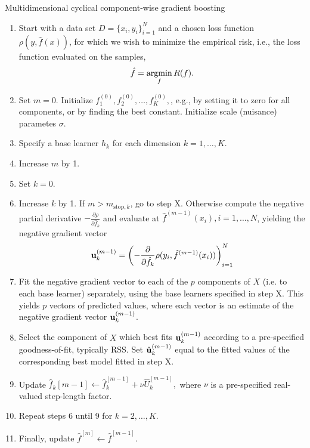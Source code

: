 \begin{algorithm}
\caption{Multidimensional cyclical component-wise gradient boosting}
\label{algo:multi-cyclical}
\begin{enumerate}
    \item Start with a data set $D=\{x_i, y_i\}_{i=1}^N$ and a chosen loss function $\rho(y,\hat{f}(x))$, for which we wish to
        minimize the empirical risk, i.e., the loss function evaluated on the samples,
        \begin{equation}
            \hat{f}=\operatorname*{argmin}_{f}R(f).
        \end{equation}
    \item Set $m=0$. Initialize $f^{(0)}_1,f^{(0)}_2,\ldots,f^{(0)}_K,$, e.g., by setting it to zero for all components, or by finding the best constant. Initialize scale (nuisance) parametes $\sigma$.
    \item Specify a base learner $h_k$ for each dimension $k=1,\ldots,K$.
    \item Increase $m$ by 1.
    \item Set $k=0$.
    \item Increase $k$ by 1. If $m>m_{\text{stop},k}$, go to step X. Otherwise compute the negative partial derivative
        $-\frac{\partial\rho}{\partial \hat{f}_k}$ and evaluate at $\hat{f}^{(m-1)}(x_i),i=1,\ldots,N$, yielding the
        negative gradient vector
        \begin{equation}
            \mathbf{u}^{(m-1)}_k=\left(-\frac{\partial}{\partial \hat{f}_k}\rho(y_i, \hat{f}^{(m-1)}(x_i))\right)_{i=1}^N
        \end{equation}
    \item Fit the negative gradient vector to each of the $p$ components of $X$ (i.e. to each base learner) separately, using the base learners specified in step X. This yields $p$ vectors of predicted values, where each vector is an estimate of the negative gradient vector $\mathbf{u}^{(m-1)}_k$.
    \item Select the component of $X$ which best fits $\mathbf{u}^{(m-1)}_k$ according to a pre-specified goodness-of-fit, typically RSS.
        Set $\hat{\mathbf{u}}^{(m-1)}_k$ equal to the fitted values of the corresponding best model fitted in step X.
    \item Update $\hat{f}_k{[m-1]}\gets\hat{f}_k^{[m-1]}+\nu\hat{U}_k^{[m-1]},$ where $\nu$ is a pre-specified real-valued step-length factor.
    \item Repeat steps 6 until 9 for $k=2,\ldots,K$. 
    \item Finally, update $\hat{f}^{[m]}\gets\hat{f}^{[m-1]}$.

\end{enumerate}
\end{algorithm}

